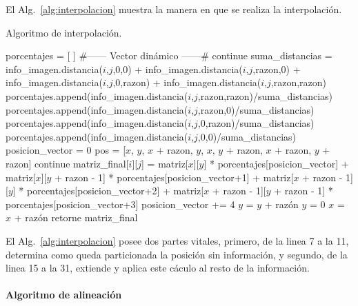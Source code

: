 El Alg.~\ref{alg:interpolacion} muestra la manera en que se realiza la
interpolación.

\begin{algorithm}
\caption{Algoritmo de interpolación.}\label{alg:interpolacion}
\label{alg:escalamiento}
\begin{algorithmic}[1]
\STATE porcentajes = [ ] \#------ Vector dinámico ------\#
\STATE continue
\ELSE
\STATE suma\_distancias = info\_imagen.distancia($i$,$j$,0,0) + info\_imagen.distancia($i$,$j$,razon,0) + info\_imagen.distancia($i$,$j$,0,razon) + info\_imagen.distancia($i$,$j$,razon,razon)
\STATE porcentajes.append(info\_imagen.distancia($i$,$j$,razon,razon)/suma\_distancias)
\STATE porcentajes.append(info\_imagen.distancia($i$,$j$,razon,0)/suma\_distancias)
\STATE porcentajes.append(info\_imagen.distancia($i$,$j$,0,razon)/suma\_distancias)
\STATE porcentajes.append(info\_imagen.distancia($i$,$j$,0,0)/suma\_distancias)
\ENDIF
\ENDWHILE
\ENDWHILE
\STATE posicion\_vector = 0
\STATE pos = [$x$, $y$, $x$ + razon, $y$, $x$, $y$ + razon, $x$ + razon, $y$ + razon]
\STATE continue
\ENDIF
\STATE matriz\_final[$i$][$j$] = matriz[$x$][$y$] * porcentajes[posicion\_vector] + matriz[$x$][$y$ + razon - 1] * porcentajes[posicion\_vector+1] + matriz[$x$ + razon - 1][$y$] * porcentajes[posicion\_vector+2] +  matriz[$x$ + razon - 1][$y$ + razon - 1] * porcentajes[posicion\_vector+3]
\STATE posicion\_vector += 4
\ENDWHILE
\ENDWHILE
\STATE $y$ = $y$ + razón
\ENDWHILE
\STATE $y$ = 0
\STATE $x$ = $x$ + razón
\ENDWHILE
\STATE retorne matriz\_final
\end{algorithmic}
\end{algorithm}

El Alg.~\ref{alg:interpolacion} posee dos partes vitales, primero, de
la linea 7 a la 11, determina como queda particionada la posición sin
información, y segundo, de la linea 15 a la 31, extiende y aplica este
cáculo al resto de la información.

\paragraph{Algoritmo de alineación}

